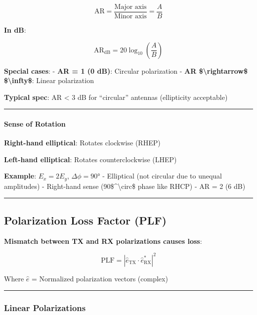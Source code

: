 \[
\text{AR} = \frac{\text{Major axis}}{\text{Minor axis}} = \frac{A}{B}
\]

\textbf{In dB}:

\[
\text{AR}_{\text{dB}} = 20\log_{10}\left(\frac{A}{B}\right)
\]

\textbf{Special cases}: - \textbf{AR = 1 (0 dB)}: Circular polarization
- \textbf{AR \$\textbackslash rightarrow\$ \$\textbackslash infty\$}:
Linear polarization

\textbf{Typical spec}: AR \textless{} 3 dB for ``circular'' antennas
(ellipticity acceptable)

\begin{center}\rule{0.5\linewidth}{0.5pt}\end{center}

\paragraph{Sense of Rotation}\label{sense-of-rotation}

\textbf{Right-hand elliptical}: Rotates clockwise (RHEP)

\textbf{Left-hand elliptical}: Rotates counterclockwise (LHEP)

\textbf{Example}: \(E_x = 2E_y\), \(\Delta\phi = 90°\) - Elliptical (not
circular due to unequal amplitudes) - Right-hand sense
(90\$\^{}\textbackslash circ\$ phase like RHCP) - AR = 2 (6 dB)

\begin{center}\rule{0.5\linewidth}{0.5pt}\end{center}

\subsection{Polarization Loss Factor
(PLF)}\label{polarization-loss-factor-plf}

\textbf{Mismatch between TX and RX polarizations causes loss}:

\[
\text{PLF} = |\hat{e}_{\text{TX}} \cdot \hat{e}_{\text{RX}}^*|^2
\]

Where \(\hat{e}\) = Normalized polarization vectors (complex)

\begin{center}\rule{0.5\linewidth}{0.5pt}\end{center}

\subsubsection{Linear Polarizations}\label{linear-polarizations}

